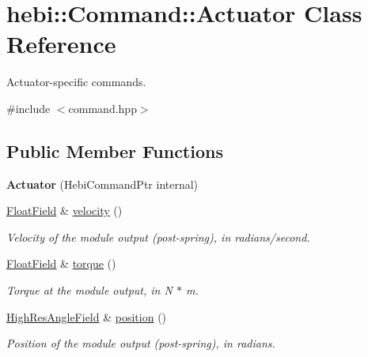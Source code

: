 \hypertarget{classhebi_1_1Command_1_1Actuator}{}\section{hebi\+:\+:Command\+:\+:Actuator Class Reference}
\label{classhebi_1_1Command_1_1Actuator}


Actuator-\/specific commands.  




{\ttfamily \#include $<$command.\+hpp$>$}

\subsection*{Public Member Functions}
\begin{DoxyCompactItemize}
\item 
{\bfseries Actuator} (Hebi\+Command\+Ptr internal)\hypertarget{classhebi_1_1Command_1_1Actuator_afe321b7e8cee804d45241b64a26fe05d}{}\label{classhebi_1_1Command_1_1Actuator_afe321b7e8cee804d45241b64a26fe05d}

\item 
\hyperlink{classhebi_1_1Command_1_1FloatField}{Float\+Field} \& \hyperlink{classhebi_1_1Command_1_1Actuator_a9f9a807011bd53ba8bc9077fc6da36c6}{velocity} ()\hypertarget{classhebi_1_1Command_1_1Actuator_a9f9a807011bd53ba8bc9077fc6da36c6}{}\label{classhebi_1_1Command_1_1Actuator_a9f9a807011bd53ba8bc9077fc6da36c6}

\begin{DoxyCompactList}\small\item\em Velocity of the module output (post-\/spring), in radians/second. \end{DoxyCompactList}\item 
\hyperlink{classhebi_1_1Command_1_1FloatField}{Float\+Field} \& \hyperlink{classhebi_1_1Command_1_1Actuator_aff547c7a88a7cfa613bdbd03ed19bbdd}{torque} ()\hypertarget{classhebi_1_1Command_1_1Actuator_aff547c7a88a7cfa613bdbd03ed19bbdd}{}\label{classhebi_1_1Command_1_1Actuator_aff547c7a88a7cfa613bdbd03ed19bbdd}

\begin{DoxyCompactList}\small\item\em Torque at the module output, in N $\ast$ m. \end{DoxyCompactList}\item 
\hyperlink{classhebi_1_1Command_1_1HighResAngleField}{High\+Res\+Angle\+Field} \& \hyperlink{classhebi_1_1Command_1_1Actuator_a8ef2c47dd77981bed74b580b5832489e}{position} ()\hypertarget{classhebi_1_1Command_1_1Actuator_a8ef2c47dd77981bed74b580b5832489e}{}\label{classhebi_1_1Command_1_1Actuator_a8ef2c47dd77981bed74b580b5832489e}

\begin{DoxyCompactList}\small\item\em Position of the module output (post-\/spring), in radians. \end{DoxyCompactList}\end{DoxyCompactItemize}


